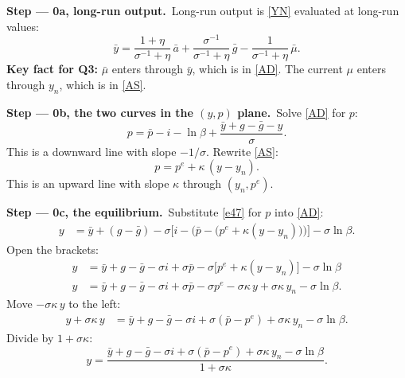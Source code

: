 \documentclass[11pt,a4paper]{article}
\newcommand{\passo}[1]{\par\smallskip\noindent\textbf{Step --- #1.}~}
\begin{document}
\passo{0a, long-run output}Long-run output is \eqref{YN} evaluated at long-run values:
\begin{equation}
\bar y=\frac{1+\eta}{\sigma^{-1}+\eta}\,\bar a+\frac{\sigma^{-1}}{\sigma^{-1}+\eta}\,\bar g-\frac{1}{\sigma^{-1}+\eta}\,\bar\mu. \label{e45}
\end{equation}
\textbf{Key fact for Q3:} $\bar\mu$ enters through $\bar y$, which is in \eqref{AD}. The current
$\mu$ enters through $y_n$, which is in \eqref{AS}.
\passo{0b, the two curves in the $(y,p)$ plane}Solve \eqref{AD} for $p$:
\begin{equation}
p=\bar p-i-\ln\beta+\frac{\bar y+g-\bar g-y}{\sigma}. \label{e46}
\end{equation}
This is a downward line with slope $-1/\sigma$. Rewrite \eqref{AS}:
\begin{equation}
p=p^e+\kappa\,(y-y_n). \label{e47}
\end{equation}
This is an upward line with slope $\kappa$ through $(y_n,p^e)$.
\passo{0c, the equilibrium}Substitute \eqref{e47} for $p$ into \eqref{AD}:
\begin{align*}
y &= \bar y+(g-\bar g)-\sigma\Big[i-\Big(\bar p-\big(p^e+\kappa(y-y_n)\big)\Big)\Big]-\sigma\ln\beta .
\end{align*}
Open the brackets:
\begin{align*}
y &= \bar y+g-\bar g-\sigma i+\sigma\bar p-\sigma\big[p^e+\kappa(y-y_n)\big]-\sigma\ln\beta\\
y &= \bar y+g-\bar g-\sigma i+\sigma\bar p-\sigma p^e-\sigma\kappa\,y+\sigma\kappa\,y_n-\sigma\ln\beta .
\end{align*}
Move $-\sigma\kappa\,y$ to the left:
\begin{align*}
y+\sigma\kappa\,y &= \bar y+g-\bar g-\sigma i+\sigma(\bar p-p^e)+\sigma\kappa\,y_n-\sigma\ln\beta .
\end{align*}
Divide by $1+\sigma\kappa$:
\begin{equation}
y=\frac{\bar y+g-\bar g-\sigma i+\sigma(\bar p-p^e)+\sigma\kappa\,y_n-\sigma\ln\beta}{1+\sigma\kappa}. \label{e48}
\end{equation}
\end{document}

